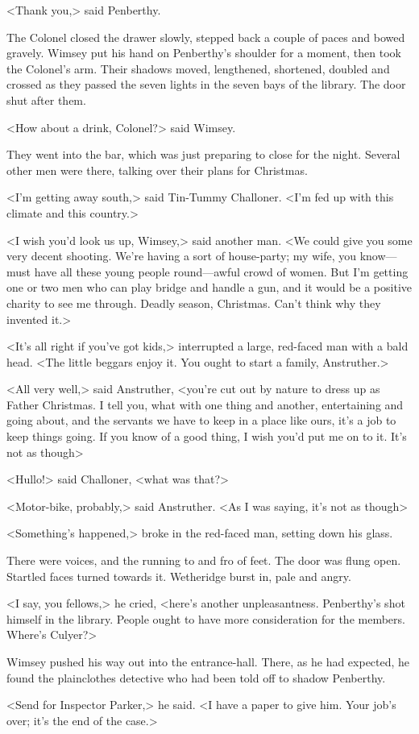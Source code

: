<Thank you,> said Penberthy.

The Colonel closed the drawer slowly, stepped back a couple of paces and bowed gravely. Wimsey put his hand on Penberthy's shoulder for a moment, then took the Colonel's arm. Their shadows moved, lengthened, shortened, doubled and crossed as they passed the seven lights in the seven bays of the library. The door shut after them.

<How about a drink, Colonel?> said Wimsey.

They went into the bar, which was just preparing to close for the night. Several other men were there, talking over their plans for Christmas.

<I'm getting away south,> said Tin-Tummy Challoner. <I'm fed up with this climate and this country.>

<I wish you'd look us up, Wimsey,> said another man. <We could give you some very decent shooting. We're having a sort of house-party; my wife, you know—must have all these young people round—awful crowd of women. But I'm getting one or two men who can play bridge and handle a gun, and it would be a positive charity to see me through. Deadly season, Christmas. Can't think why they invented it.>

<It's all right if you've got kids,> interrupted a large, red-faced man with a bald head. <The little beggars enjoy it. You ought to start a family, Anstruther.>

<All very well,> said Anstruther, <you're cut out by nature to dress up as Father Christmas. I tell you, what with one thing and another, entertaining and going about, and the servants we have to keep in a place like ours, it's a job to keep things going. If you know of a good thing, I wish you'd put me on to it. It's not as though\longdash>

<Hullo!> said Challoner, <what was that?>

<Motor-bike, probably,> said Anstruther. <As I was saying, it's not as though\longdash>

<Something's happened,> broke in the red-faced man, setting down his glass.

There were voices, and the running to and fro of feet. The door was flung open. Startled faces turned towards it. Wetheridge burst in, pale and angry.

<I say, you fellows,> he cried, <here's another unpleasantness. Penberthy's shot himself in the library. People ought to have more consideration for the members. Where's Culyer?>

Wimsey pushed his way out into the entrance-hall. There, as he had expected, he found the plainclothes detective who had been told off to shadow Penberthy.

<Send for Inspector Parker,> he said. <I have a paper to give him. Your job's over; it's the end of the case.>